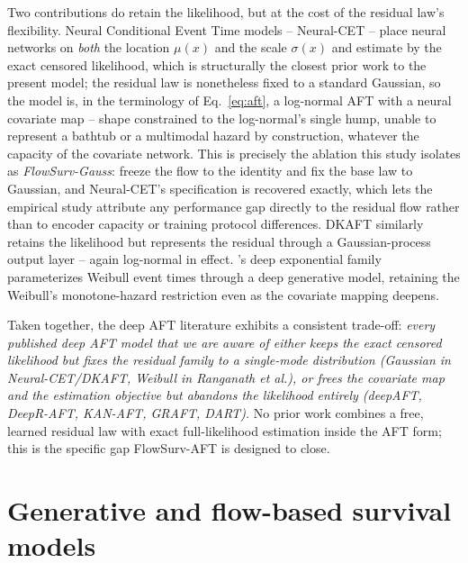 \documentclass[11pt]{article}
\begin{document}
Two contributions do retain the likelihood, but at the cost of the
residual law's flexibility. Neural Conditional Event Time models
\citep{engelhard2020neuralcet} -- Neural-CET -- place neural networks on
\emph{both} the location $\mu(x)$ and the scale $\sigma(x)$ and estimate
by the exact censored likelihood, which is structurally the closest prior
work to the present model; the residual law is nonetheless fixed to a
standard Gaussian, so the model is, in the terminology of
Eq.~\eqref{eq:aft}, a log-normal AFT with a neural covariate map -- shape
constrained to the log-normal's single hump, unable to represent a
bathtub or a multimodal hazard by construction, whatever the capacity of
the covariate network. This is precisely the ablation this study
isolates as \emph{FlowSurv-Gauss}: freeze the flow to the identity and fix
the base law to Gaussian, and Neural-CET's specification is recovered
exactly, which lets the empirical study attribute any performance gap
directly to the residual flow rather than to encoder capacity or training
protocol differences. DKAFT \citep{wu2021dkaft} similarly retains the
likelihood but represents the residual through a Gaussian-process output
layer -- again log-normal in effect. \citet{ranganath2016deepsurv}'s deep
exponential family parameterizes Weibull event times through a deep
generative model, retaining the Weibull's monotone-hazard restriction
even as the covariate mapping deepens.

Taken together, the deep AFT literature exhibits a consistent trade-off:
\emph{every published deep AFT model that we are aware of either keeps
the exact censored likelihood but fixes the residual family to a
single-mode distribution (Gaussian in Neural-CET/DKAFT, Weibull in
Ranganath et al.), or frees the covariate map and the estimation
objective but abandons the likelihood entirely (deepAFT, DeepR-AFT,
KAN-AFT, GRAFT, DART).} No prior work combines a free, learned residual
law with exact full-likelihood estimation inside the AFT form; this is
the specific gap FlowSurv-AFT is designed to close.

\section{Generative and flow-based survival models}
\label{sec:generative}
\end{document}
